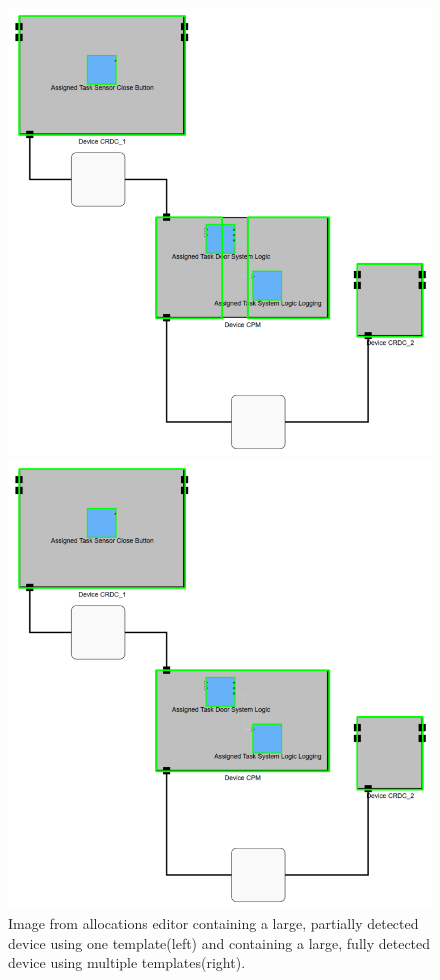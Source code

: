 \begin{figure}[htb]
    \centering
    \begin{minipage}[b]{0.45\textwidth}
        \includegraphics[width=\textwidth]{Pictures/many_templates_before.png}
    \end{minipage}
    \hfill
    \begin{minipage}[b]{0.45\textwidth}
        \includegraphics[width=\textwidth]{Pictures/many_templates_after.png}
    \end{minipage}
    \caption{Image from allocations editor containing a large, partially detected device using one template(left) and containing a large, fully detected device using multiple templates(right).}
    \label{fig_many_templates}
\end{figure}
